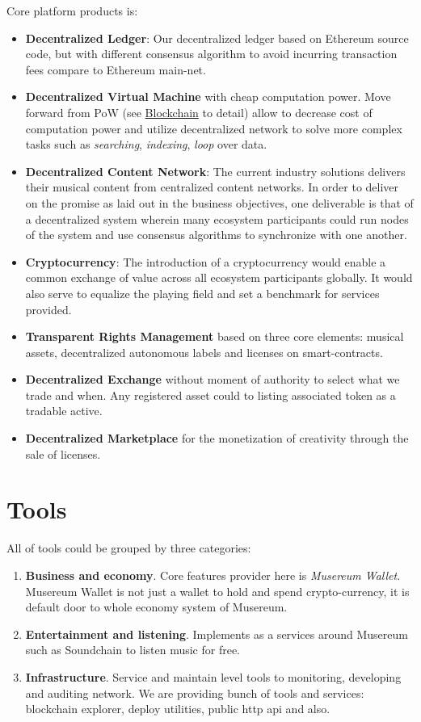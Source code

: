\documentclass[12pt]{report}
\newcommand{\hlc}[1]{\colorbox{yellow!25}{#1}}
\begin{document}
Core platform products is:
\begin{itemize}
	\item \textbf{Decentralized Ledger}: Our decentralized ledger based on Ethereum source code, but with different consensus algorithm to avoid incurring transaction fees compare to Ethereum main-net.
	\item \textbf{Decentralized Virtual Machine} with cheap computation power. Move forward from PoW (see \hyperref[tech-blockchain]{Blockchain} to detail) allow to decrease cost of computation power and utilize decentralized network to solve more complex tasks such as \textit{searching}, \textit{indexing}, \textit{loop} over data.
	\item \textbf{Decentralized Content Network}: The current industry solutions  delivers their musical content from centralized content networks. In order to deliver on the promise as laid out in the business objectives, one deliverable is that of a decentralized system wherein many ecosystem participants could run nodes of the system and use consensus algorithms to synchronize
with one another.
	\item \textbf{Cryptocurrency}: The introduction of a cryptocurrency would enable a common exchange of value across all ecosystem participants globally. It would also serve to equalize the playing field and set a benchmark for services provided.
	\item \textbf{Transparent Rights Management} based on three core elements: musical assets, decentralized autonomous labels and licenses on smart-contracts.
	\item \textbf{Decentralized Exchange} without moment of authority to select what we trade and when. Any registered asset could to listing associated token as a tradable active.
	\item \textbf{Decentralized Marketplace} for the monetization of creativity through the sale of licenses.
\end{itemize}

\section{\hlc{Tools}}
\label{platform-tools}
All of tools could be grouped by three categories:
\begin{enumerate}
	\item \textbf{Business and economy}. Core features provider here is \textit{Musereum Wallet}. Musereum Wallet is not just a wallet to hold and spend crypto-currency, it is default door to whole economy system of Musereum. 
	\item \textbf{Entertainment and listening}. Implements as a services around Musereum such as Soundchain to listen music for free.
	\item \textbf{Infrastructure}. Service and maintain level tools to monitoring, developing and auditing network. We are providing bunch of tools and services: blockchain explorer, deploy utilities, public http api and also.
\end{enumerate}
\end{document}
